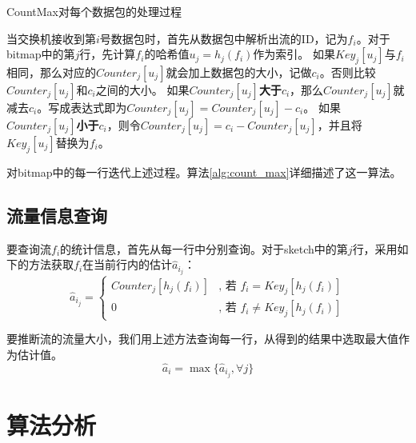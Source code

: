 \begin{algorithm}[htb]
    \small
    \SetAlgoLined
  
    \caption{CountMax对每个数据包的处理过程}
    \label{alg:count_max}
\end{algorithm}
当交换机接收到第$i$号数据包时，首先从数据包中解析出流的ID，记为$f_i$。对于bitmap中的第$j$行，先计算$f_i$的哈希值$u_{j}=h_{j}(f_i)$作为索引。
如果$Key_{j}[u_{j}]$与$f_i$相同，那么对应的$Counter_{j}[u_{j}]$就会加上数据包的大小，记做$c_i$。否则比较$Counter_{j}[u_{j}]$和$c_i$之间的大小。
如果$Counter_{j}[u_{j}]$\textbf{大于}$c_i$，那么$Counter_{j}[u_{j}]$就减去$c_i$。写成表达式即为$Counter_{j}[u_{j}] = Counter_{j}[u_{j}] - c_i$。
如果$Counter_{j}[u_{j}]$\textbf{小于}$c_i$，则令$Counter_{j}[u_{j}]=c_i - Counter_{j}[u_{j}]$，并且将$Key_{j}[u_{j}]$替换为$f_i$。

对bitmap中的每一行迭代上述过程。算法\ref{alg:count_max}详细描述了这一算法。

\subsection{流量信息查询}
%
要查询流$f_i$的统计信息，首先从每一行中分别查询。对于sketch中的第$j$行，采用如下的方法获取$f_i$在当前行内的估计$\hat{a}_{i_{j}}$：
\begin{equation}
\hat{a}_{i_{j}}=\left\{
\begin{aligned}
Counter_{j}[h_j(f_i)]&\text{, 若 $f_i=Key_{j}[h_j(f_i)]$}\\
0&\text{, 若 $f_i \ne Key_{j}[h_j(f_i)]$}
\end{aligned}
\right.
\end{equation}

要推断流的流量大小，我们用上述方法查询每一行，从得到的结果中选取最大值作为估计值。
\begin{equation}
\label{eq:query}
\hat{a}_{i}=\max{\{\hat{a}_{i_{j}} , \forall j\}}
\end{equation}

\section{算法分析}\label{sec:analysis}
\label{subsec:analysis}
%

